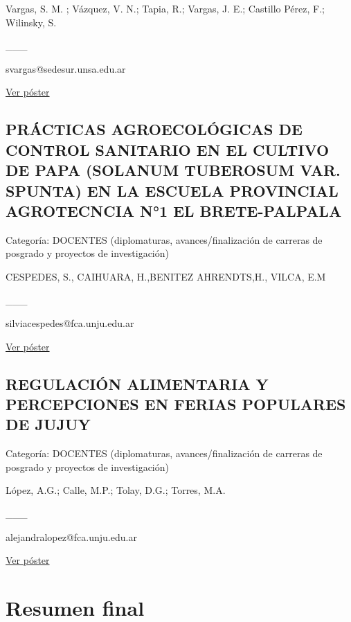 \documentclass[
  spanish,
  letterpaper,
  DIV=11,
  numbers=noendperiod]{scrreprt}
\begin{document}
Vargas, S. M. ; Vázquez, V. N.; Tapia, R.; Vargas, J. E.; Castillo
Pérez, F.; Wilinsky, S.

\_\_\_

svargas@sedesur.unsa.edu.ar

\href{https://drive.google.com/open?id=1orFTh6IXkpXXcTmV-7YXqAP7TGLsHdhP}{Ver
póster}

\section{PRÁCTICAS AGROECOLÓGICAS DE CONTROL SANITARIO EN EL CULTIVO DE
PAPA (SOLANUM TUBEROSUM VAR. SPUNTA) EN LA ESCUELA PROVINCIAL
AGROTECNCIA N°1 EL
BRETE-PALPALA}\label{pruxe1cticas-agroecoluxf3gicas-de-control-sanitario-en-el-cultivo-de-papa-solanum-tuberosum-var.-spunta-en-la-escuela-provincial-agrotecncia-n1-el-brete-palpala}

Categoría: DOCENTES (diplomaturas, avances/finalización de carreras de
posgrado y proyectos de investigación)

CESPEDES, S., CAIHUARA, H.,BENITEZ AHRENDTS,H., VILCA, E.M

\_\_\_

silviacespedes@fca.unju.edu.ar

\href{https://drive.google.com/open?id=10G-fqiXG0gLGZqquxlg6o2s7X4Ku2Axh}{Ver
póster}

\section{REGULACIÓN ALIMENTARIA Y PERCEPCIONES EN FERIAS POPULARES DE
JUJUY}\label{regulaciuxf3n-alimentaria-y-percepciones-en-ferias-populares-de-jujuy}

Categoría: DOCENTES (diplomaturas, avances/finalización de carreras de
posgrado y proyectos de investigación)

López, A.G.; Calle, M.P.; Tolay, D.G.; Torres, M.A.

\_\_\_

alejandralopez@fca.unju.edu.ar

\href{https://drive.google.com/open?id=1fMvnGz8dsi0_veGh658qsaRR41Oy5_Lb}{Ver
póster}


\chapter*{Resumen final}\label{resumen-final}
\end{document}
